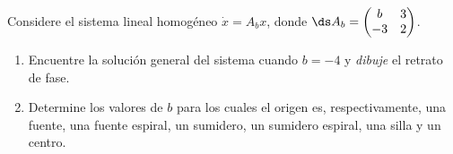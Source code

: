\documentclass{homework}
\begin{document}
\begin{prob}
    Considere el sistema lineal homogéneo \(\dot{x}=A_bx\), donde \(\ds A_b=\begin{pmatrix}
        b & 3\\-3 & 2
    \end{pmatrix}\).
    \begin{enumerate}[label=(\alph*)]
        \item Encuentre la solución general del sistema cuando \(b=-4\) y \textit{dibuje} el retrato de fase.
        \item Determine los valores de \(b\) para los cuales el origen es, respectivamente, una fuente, una fuente espiral, un sumidero, un sumidero espiral, una silla y un centro.
    \end{enumerate}
\end{prob}
\end{document}
